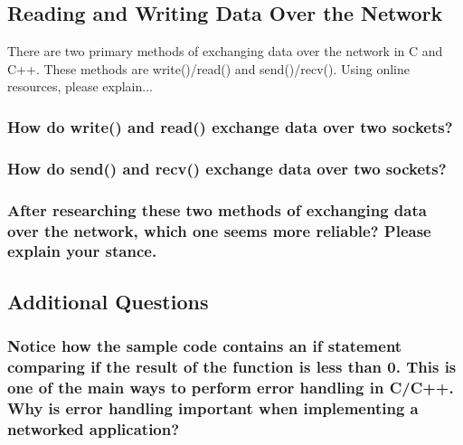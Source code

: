 \documentclass{article}
\begin{document}
	\begin{Large}
		\subsection{\textbf{Reading and Writing Data Over the Network}}
	\end{Large}
	There are two primary methods of exchanging data over the network in C and C++. These methods are write()/read() and send()/recv(). Using online resources, please explain...
	
	\subsubsection{How do write() and read() exchange data over two sockets?}
	\vspace{108pt}
	
	\subsubsection{How do send() and recv() exchange data over two sockets?}
	\vspace{108pt}
	
	\subsubsection{After researching these two methods of exchanging data over the network, which one seems more reliable? Please explain your stance.}
	\pagebreak{}
	
	\begin{Large}
		\subsection{\textbf{Additional Questions}}
	\end{Large}
	
	\subsubsection{Notice how the sample code contains an if statement comparing if the result of the function is less than 0. This is one of the main ways to perform error handling in C/C++. Why is error handling important when implementing a networked application?}
	\vspace{108pt}
	
	
\end{document}
